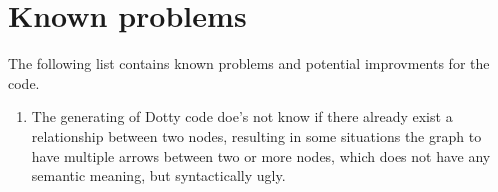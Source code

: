 \documentclass[a4paper,USenglish]{article}
\begin{document}
\section{Known problems}
The following list contains known problems and potential improvments for the code.

\begin{enumerate}
	\item The generating of Dotty code doe's not know if there already exist a relationship between
	two nodes, resulting in some situations the graph to have multiple arrows between two or more nodes,
	which does not have any semantic meaning, but syntactically ugly.
\end{enumerate}

\printbibliography
\end{document}
